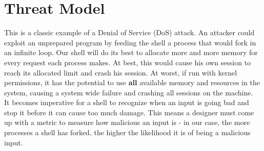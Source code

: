 \documentclass{article}
\begin{document}


\section{Threat Model}
This is a classic example of a Denial of Service (DoS) attack. An attacker 
could exploit an unprepared program by feeding the shell a process that would
fork in an infinite loop. Our shell will do its best to allocate more and more
memory for every request each process makes. At best, this would cause his own 
session to reach its allocated limit and crash his session. At worst, if run 
with kernel permissions, it has the potential to use \textbf{all} available 
memory and resources in the system, causing a system wide failure and crashing 
all sessions on the machine. \\
It becomes imperative for a shell to recognize when an input is going bad and
stop it before it can cause too much damage. This means a designer must come up
with a metric to measure how malicious an input is - in our case, the more
processes a shell has forked, the higher the likelihood it is of being a
malicious input. \\

\end{document}
